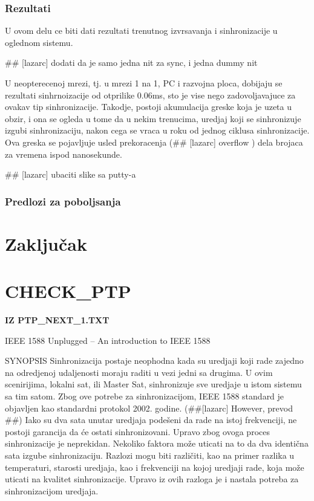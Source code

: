 \documentclass[a4paper,12pt, master]{etf}
\begin{document}
    \subsection{Rezultati}

    U ovom delu ce biti dati rezultati trenutnog izvrsavanja i sinhronizacije u oglednom sistemu.

    \#\# [lazarc] dodati da je samo jedna nit za sync, i jedna dummy nit

    U neopterecenoj mrezi, tj. u mrezi 1 na 1, PC i razvojna ploca, dobijaju se rezultati sinhrnoizacije od 
    otprilike 0.06ms, sto je vise nego zadovoljavajuce za ovakav tip sinhronizacije. Takodje, postoji 
    akumulacija greske koja je uzeta u obzir, i ona se ogleda u tome da u nekim trenucima, uredjaj koji se 
    sinhronizuje izgubi sinhronizaciju, nakon cega se vraca u roku od jednog ciklusa sinhronizacije. Ova 
    greska se pojavljuje usled prekoracenja (\#\# [lazarc] overflow ) dela brojaca za vremena ispod 
    nanosekunde. 

    \#\# [lazarc] ubaciti slike sa putty-a

    \subsection{Predlozi za poboljsanja}

	\newpage

	\chapter{Zaključak}

	\newpage

	\chapter{CHECK\_PTP}
    
	\textbf{IZ PTP\_NEXT\_1.TXT}

	IEEE 1588 Unplugged – An introduction to IEEE 1588
	
	SYNOPSIS
	Sinhronizacija postaje neophodna kada su uredjaji koji rade zajedno na odredjenoj 
	udaljenosti moraju raditi u vezi jedni sa drugima. U ovim scenirijima, lokalni sat, ili 
	Master Sat, sinhronizuje sve uredjaje u istom sistemu sa tim satom. Zbog ove potrebe za 
	sinhronizacijom, IEEE 1588 standard je objavljen kao standardni protokol 2002. godine.
	(\#\#[lazarc] However, prevod \#\#) Iako su dva sata unutar uredjaja pode\v{s}eni da rade na 
	istoj frekvenciji, ne postoji garancija da \'{c}e ostati sinhronizovani. Upravo zbog ovoga 
	proces sinhronizacije je neprekidan. Nekoliko faktora mo\v{z}e uticati na to da dva identi\v{c}na 
	sata izgube sinhronizaciju. Razlozi mogu biti razli\v{c}iti, kao na primer razlika u 
	temperaturi, starosti uredjaja, kao i frekvenciji na kojoj uredjaji rade, koja mo\v{z}e 
	uticati na kvalitet sinhronizacije. Upravo iz ovih razloga je i nastala potreba za 
	sinhronizacijom uredjaja.
	
\end{document}
